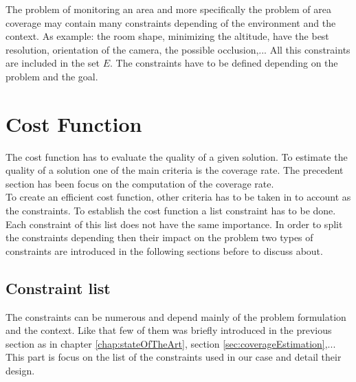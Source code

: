 The problem of monitoring an area and more specifically the problem of area coverage may contain many constraints depending of the environment and the context. As example: the room shape, minimizing  the altitude,  have the best resolution, orientation of the camera, the possible occlusion,... All this constraints are included in the set $E$. 
The constraints have to be defined depending on the problem and the goal.

\section{Cost Function}
The cost function has to evaluate the quality of a given solution. To estimate the quality of a solution one of the main criteria is the coverage rate. The precedent section has been focus on the computation of the coverage rate. \\
To create an efficient cost function, other criteria has to be taken in to account as the constraints.  
 To establish the cost function a list constraint has to be done. Each constraint of this list does not have the same importance. In order to split the constraints depending then their impact on the problem two types of constraints are introduced in the  following sections before to discuss about.
 

\subsection{Constraint list}\label{sec:constraint}

 The constraints can be numerous and depend mainly of the problem formulation and the context. Like that few of them was briefly introduced in the previous section as in chapter \ref{chap:stateOfTheArt}, section \ref{sec:coverageEstimation},... This part is focus on the list of the constraints used in our case and detail their design.

